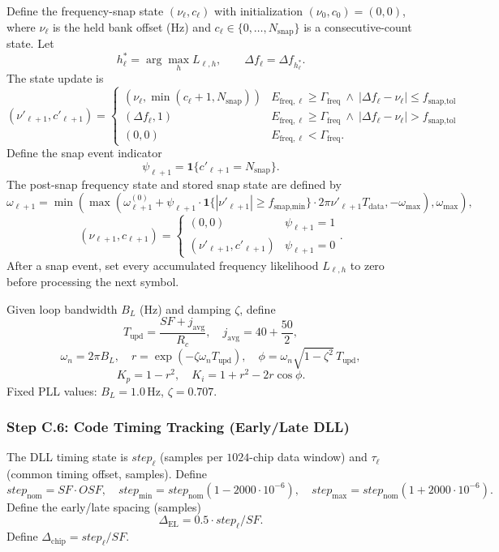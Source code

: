 \documentclass[11pt]{article}
\begin{document}
Define the frequency-snap state $(\nu_\ell,c_\ell)$ with initialization $(\nu_0,c_0)=(0,0)$, where $\nu_\ell$ is the held bank offset (Hz) and $c_\ell\in\{0,\dots,N_{\text{snap}}\}$ is a consecutive-count state. Let
\[
  h^*_{\ell}=\arg\max_h L_{\ell,h},\qquad \Delta f_{\ell}=\Delta f_{h^*_{\ell}}.
\]
The state update is
\[
  (\nu'_{\ell+1},c'_{\ell+1})=
  \begin{cases}
  (\nu_\ell,\min(c_\ell+1,N_{\text{snap}})) & E_{\text{freq},\ell}\ge\Gamma_{\text{freq}}\ \wedge\ |\Delta f_{\ell}-\nu_\ell|\le f_{\text{snap,tol}}\\
  (\Delta f_{\ell},1) & E_{\text{freq},\ell}\ge\Gamma_{\text{freq}}\ \wedge\ |\Delta f_{\ell}-\nu_\ell|>f_{\text{snap,tol}}\\
  (0,0) & E_{\text{freq},\ell}<\Gamma_{\text{freq}}.
  \end{cases}
\]
Define the snap event indicator
\[
  \psi_{\ell+1}=\mathbf{1}\{c'_{\ell+1}=N_{\text{snap}}\}.
\]
The post-snap frequency state and stored snap state are defined by
\[
  \omega_{\ell+1}=\min\!\left(\max\!\left(\omega_{\ell+1}^{(0)}+\psi_{\ell+1}\cdot \mathbf{1}\{|\nu'_{\ell+1}|\ge f_{\text{snap,min}}\}\cdot 2\pi\nu'_{\ell+1}T_{\text{data}},-\omega_{\max}\right),\omega_{\max}\right),
\]
\[
  (\nu_{\ell+1},c_{\ell+1})=
  \begin{cases}
  (0,0) & \psi_{\ell+1}=1\\
  (\nu'_{\ell+1},c'_{\ell+1}) & \psi_{\ell+1}=0
  \end{cases}.
\]
After a snap event, set every accumulated frequency likelihood $L_{\ell,h}$ to zero before processing the next symbol.

Given loop bandwidth $B_L$ (Hz) and damping $\zeta$, define
\[
  T_{\text{upd}}=\frac{\mathit{SF}+j_{\text{avg}}}{R_c},\quad j_{\text{avg}}=40+\frac{50}{2},
\]
\[
  \omega_n=2\pi B_L,\quad r=\exp(-\zeta\omega_n T_{\text{upd}}),\quad \phi=\omega_n\sqrt{1-\zeta^2}\,T_{\text{upd}},
\]
\[
  K_p = 1-r^2,\quad K_i = 1+r^2-2r\cos\phi.
\]
Fixed PLL values: $B_L=1.0\,\text{Hz}$, $\zeta=0.707$.

\subsubsection{Step C.6: Code Timing Tracking (Early/Late DLL)}

The DLL timing state is $\mathit{step}_\ell$ (samples per $1024$-chip data window) and $\tau_\ell$ (common timing offset, samples). Define
\[
  \mathit{step}_{\text{nom}}=\mathit{SF}\cdot \mathit{OSF},\quad
  \mathit{step}_{\min}=\mathit{step}_{\text{nom}}(1-2000\cdot 10^{-6}),\quad
  \mathit{step}_{\max}=\mathit{step}_{\text{nom}}(1+2000\cdot 10^{-6}).
\]
Define the early/late spacing (samples)
\[
  \Delta_{\text{EL}} = 0.5\cdot \mathit{step}_\ell/\mathit{SF}.
\]
Define $\Delta_{\text{chip}}=\mathit{step}_\ell/\mathit{SF}$.
\end{document}
